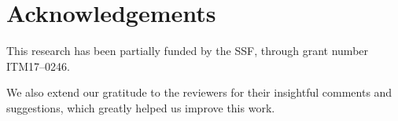\section*{Acknowledgements}\label{sec:acks}

This research has been partially funded by the \ac{SSF}, through grant number ITM17--0246.

We also extend our gratitude to the reviewers for their insightful comments and suggestions, which greatly helped us improve this work.
